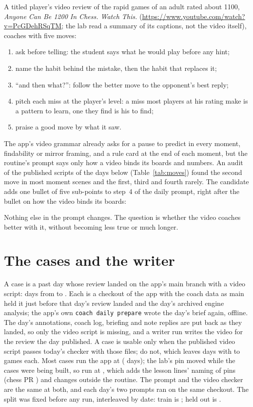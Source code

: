 \documentclass[11pt]{article}
\begin{document}
A titled player's video review of the rapid games of an adult rated about 1100, \emph{Anyone Can Be
1200 In Chess. Watch This.} (\url{https://www.youtube.com/watch?v=PcGDehRSqTM}; the lab read a
summary of its captions, not the video itself), coaches with five moves:
\begin{enumerate}[nosep]
\item ask before telling: the student says what he would play before any hint;
\item name the habit behind the mistake, then the habit that replaces it;
\item ``and then what?'': follow the better move to the opponent's best reply;
\item pitch each miss at the player's level: a miss most players at his rating make is a pattern to
learn, one they find is his to find;
\item praise a good move by what it saw.
\end{enumerate}
The app's video grammar already asks for a pause to predict in every moment, findability or mirror
framing, and a rule card at the end of each moment, but the routine's prompt says only how a video
binds its boards and numbers. An audit of the \PublishedN{} published scripts of the days below
(Table~\ref{tab:moves}) found the second move in most moment scenes and the first, third and fourth
rarely. The candidate adds one bullet of five sub-points to step~4 of the daily prompt, right after
the bullet on how the video binds its boards:

\CandidateBullet

Nothing else in the prompt changes. The question is whether the video coaches better with it,
without becoming less true or much longer.

\section{The cases and the writer}

A case is a past day whose review landed on the app's main branch with a video script: \AllDays{}
days from \FirstDay{} to \LastDay. Each is a checkout of the app with the coach data as main held
it just before that day's review landed and the day's archived engine analysis; the app's own
\texttt{coach daily prepare} wrote the day's brief again, offline. The day's annotations, coach log,
briefing and note replies are put back as they landed, so only the video script is missing, and a
writer run writes the video for the review the day published. A case is usable only when the
published video script passes today's checker with those files; \Unusable{} do not, which leaves
\Cases{} days with \GamesMin{} to \GamesMax{} games each. Most cases run the app at
\texttt{\AppCommit} (\AppCommitDays{} days); the lab's pin moved while the cases were being built,
so \LaterCommitList{} run at \texttt{\LaterCommit}, which adds the lesson lines' naming of pins
(chess PR \PinMovePR) and changes outside the routine. The prompt and the video checker are the
same at both, and each day's two prompts ran on the same checkout. The split was fixed before any
run, interleaved by date: train is \TrainCases; held out is \HeldCases.
\end{document}
